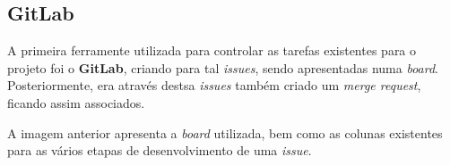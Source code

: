 \subsection{GitLab}

A primeira ferramente utilizada para controlar as tarefas existentes para o projeto foi o \textbf{GitLab}, criando para tal \textit{issues}, sendo apresentadas numa \textit{board}. Posteriormente, era através destsa \textit{issues} também criado um \textit{merge request}, ficando assim associados.


A imagem anterior apresenta a \textit{board} utilizada, bem como as colunas existentes para as vários etapas de desenvolvimento de uma \textit{issue}.
